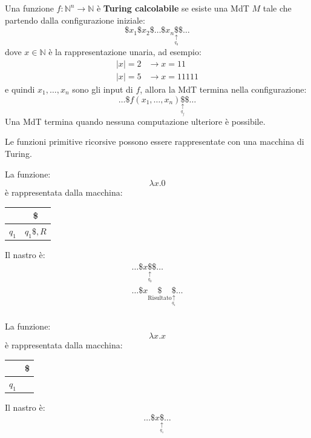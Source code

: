 \documentclass[a4paper]{article}
\begin{document}
\vspace{3em}
\noindent
\begin{theorem}
  Una funzione \( f: \mathbb{N}^n \to \mathbb{N} \) è \textbf{Turing calcolabile} se
  esiste una MdT \( M \) tale che partendo dalla configurazione iniziale:
  \[
    \$ x_1 \$ x_2 \$ \ldots \$ x_n \underset{\underset{q_0}{\uparrow}}{\$} \$ \ldots
  \] 
  dove \( x \in \mathbb{N} \) è la rappresentazione unaria, ad esempio: 
  \[
    \begin{aligned}
      |x| = 2 &\to x = 11\\
      |x| = 5 &\to x = 11111
    \end{aligned}
  \] 
  e quindi \( x_1, \ldots, x_n \) sono gli input di \( f \), allora la MdT termina nella
  configurazione:
  \[
    \ldots\$ f(x_1, \ldots, x_n) \underset{\underset{q_f}{\uparrow}}{\$} \$ \ldots
  \] 
  Una MdT termina quando nessuna computazione ulteriore è possibile.
\end{theorem}

\vspace{1em}
\noindent
Le funzioni primitive ricorsive possono essere rappresentate con una macchina di Turing.
\begin{example}
  La funzione:
  \[
    \lambda x.0
  \] 
  è rappresentata dalla macchina:
  \begin{table}[H]
    \centering
    \begin{tabular}{|c|c|}
      \hline
      & \$ \\
      \hline
      \( q_1 \) & \( q_1 \$, R \) \\
      \hline
    \end{tabular}
  \end{table}
  Il nastro è:
  \[
    \begin{aligned}
      \ldots \$ x \underset{\underset{q_0}{\uparrow}}{\$} \$ \ldots \\
      \ldots \$ x \underset{\text{Risultato}}{\$} \underset{\underset{q_1}{\uparrow}}{\$} \ldots \\
    \end{aligned}
  \] 
\end{example}

\begin{example}
  La funzione:
  \[
    \lambda x.x
  \] 
  è rappresentata dalla macchina:
  \begin{table}[H]
    \centering
    \begin{tabular}{|c|c|}
      \hline
      & \$ \\
      \hline
      \( q_1 \) & \\
      \hline
    \end{tabular}
  \end{table}
  Il nastro è:
  \[
    \ldots \$ x \underset{\underset{q_1}{\uparrow}}{\$} \ldots
  \] 
\end{example}
\end{document}
